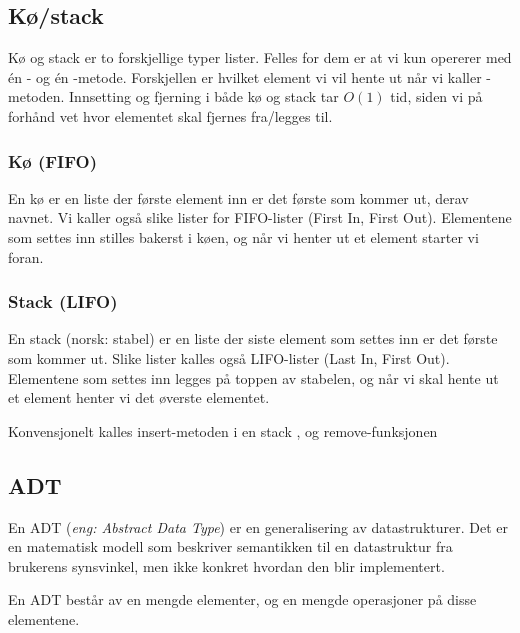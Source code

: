 \subsection{Kø/stack} \label{ko_stack}
Kø og stack er to forskjellige typer lister. Felles for dem er at vi kun opererer med én - og én -metode. Forskjellen er hvilket element vi vil hente ut når vi kaller -metoden. Innsetting og fjerning i både kø og stack tar $ O(1) $ tid, siden vi på forhånd vet hvor elementet skal fjernes fra/legges til. 


\subsubsection{Kø (FIFO)}
En kø er en liste der første element inn er det første som kommer ut, derav navnet. Vi kaller også slike lister for FIFO-lister (First In, First Out). Elementene som settes inn stilles bakerst i køen, og når vi henter ut et element starter vi foran. 


\subsubsection{Stack (LIFO)}
En stack (norsk: stabel) er en liste der siste element som settes inn er det første som kommer ut. Slike lister kalles også LIFO-lister (Last In, First Out). Elementene som settes inn legges på toppen av stabelen, og når vi skal hente ut et element henter vi det øverste elementet. 

Konvensjonelt kalles insert-metoden i en stack , og remove-funksjonen 


\subsection{ADT}
En ADT (\textit{eng: Abstract Data Type}) er en generalisering av datastrukturer. Det er en matematisk modell som beskriver semantikken til en datastruktur fra brukerens synsvinkel, men ikke konkret hvordan den blir implementert. 

\begin{definition}
	En ADT består av en mengde elementer, og en mengde operasjoner på disse elementene. 
\end{definition}

